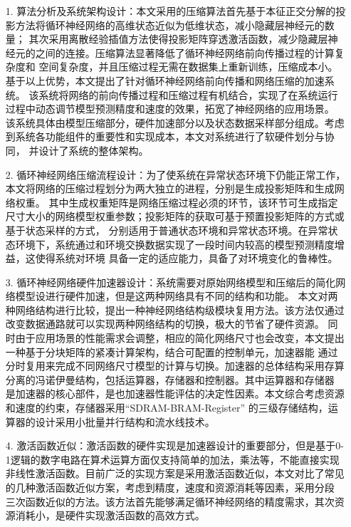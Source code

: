\begin{itemize}
\vspace{4pt}
\item[1.]算法分析及系统架构设计：本文采用的压缩算法首先基于本征正交分解的投影方法将循环神经网络的高维状态近似为低维状态，减小隐藏层神经元的数量；
其次采用离散经验插值方法使得投影矩阵穿透激活函数，减少隐藏层神经元的之间的连接。压缩算法显著降低了循环神经网络前向传播过程的计算复杂度和
空间复杂度，并且压缩过程无需在数据集上重新训练，压缩成本小。基于以上优势，本文提出了针对循环神经网络前向传播和网络压缩的加速系统。
该系统将网络的前向传播过程和压缩过程有机结合，实现了在系统运行过程中动态调节模型预测精度和速度的效果，拓宽了神经网络的应用场景。
该系统具体由模型压缩部分，硬件加速部分以及状态数据采样部分组成。考虑到系统各功能组件的重要性和实现成本，本文对系统进行了软硬件划分与协同，
并设计了系统的整体架构。
\vspace{4pt}
\item[2.]循环神经网络压缩流程设计：为了使系统在异常状态环境下仍能正常工作，本文将网络的压缩过程划分为两大独立的进程，分别是生成投影矩阵和生成网络权重。
其中生成权重矩阵是网络压缩过程必须的环节，该环节可生成指定尺寸大小的网络模型权重参数；投影矩阵的获取可基于预置投影矩阵的方式或基于状态采样的方式，
分别适用于普通状态环境和异常状态环境。在异常状态环境下，系统通过和环境交换数据实现了一段时间内较高的模型预测精度增益，这使得系统对环境
具备一定的适应能力，具备了对环境变化的鲁棒性。

\vspace{4pt}
\item[3.]循环神经网络硬件加速器设计：系统需要对原始网络模型和压缩后的简化网络模型设进行硬件加速，但是这两种网络具有不同的结构和功能。
本文对两种网络结构进行比较，提出一种神经网络结构级模块复用方法。该方法仅通过改变数据通路就可以实现两种网络结构的切换，极大的节省了硬件资源。
同时由于应用场景的性能需求会调整，相应的简化网络尺寸也会改变，本文提出一种基于分块矩阵的紧凑计算架构，结合可配置的控制单元，加速器能
通过分时复用来完成不同网络尺寸模型的计算与切换。加速器的总体结构采用存算分离的冯诺伊曼结构，包括运算器，存储器和控制器。其中运算器和存储器
是加速器的核心部件，是也加速器性能评估的决定性因素。本文综合考虑资源和速度的约束，存储器采用“SDRAM-BRAM-Register”
的三级存储结构，运算器的设计采用小批量并行结构和流水线技术。

\vspace{4pt}
\item[4.]激活函数近似：激活函数的硬件实现是加速器设计的重要部分，但是基于0-1逻辑的数字电路在算术运算方面仅支持简单的加法，乘法等，不能直接实现
非线性激活函数。目前广泛的实现方案是采用激活函数近似，本文对比了常见的几种激活函数近似方案，考虑到精度，速度和资源消耗等因素，采用分段
三次函数近似的方法。该方法首先能够满足循环神经网络的精度需求，其次资源消耗小，是硬件实现激活函数的高效方式。
\vspace{4pt}
\end{itemize}

